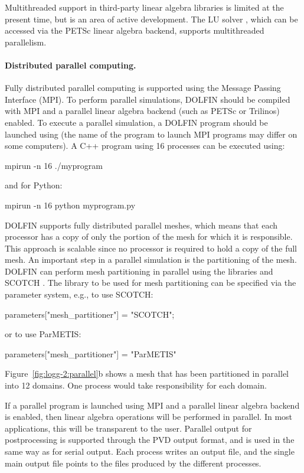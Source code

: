 Multithreaded support in third-party linear algebra libraries is limited
at the present time, but is an area of active development.  The LU solver
\citet{www:pastix}, which can be accessed via the PETSc linear algebra
backend, supports multithreaded parallelism.

\paragraph{Distributed parallel computing.}

Fully distributed parallel computing is supported using the Message
Passing Interface (MPI). To perform parallel simulations, DOLFIN should
be compiled with MPI and a parallel linear algebra backend (such as PETSc
or Trilinos) enabled. To execute a parallel simulation, a DOLFIN program
should be launched using  (the name of the program to launch MPI
programs may differ on some computers). A C++ program using 16 processes
can be executed using:
\begin{bash}
mpirun -n 16 ./myprogram
\end{bash}
and for Python:
\begin{bash}
mpirun -n 16 python myprogram.py
\end{bash}

DOLFIN supports fully distributed parallel meshes, which means that each
processor has a copy of only the portion of the mesh for which it is
responsible. This approach is scalable since no processor is required
to hold a copy of the full mesh.
An important step in a parallel simulation is the partitioning of the
mesh. DOLFIN can perform mesh partitioning in parallel using the libraries
\citet{www:parmetis} and SCOTCH \citep{www:scotch}.  The library to be
used for mesh partitioning can be specified via the parameter system,
e.g., to use SCOTCH:
\begin{c++}
parameters["mesh_partitioner"] = "SCOTCH";
\end{c++}
or to use ParMETIS:
\begin{python}
parameters["mesh_partitioner"] = "ParMETIS"
\end{python}
Figure~\ref{fig:logg-2:parallel}b shows a mesh that has been partitioned
in parallel into 12 domains. One process would take responsibility
for each domain.

If a parallel program is launched using MPI and a parallel linear
algebra backend is enabled, then linear algebra operations will be
performed in parallel. In most applications, this will be transparent
to the user.  Parallel output for postprocessing is supported through
the PVD output format, and is used in the same way as for serial
output. Each process writes an output file, and the single main output
file points to the files produced by the different processes.

